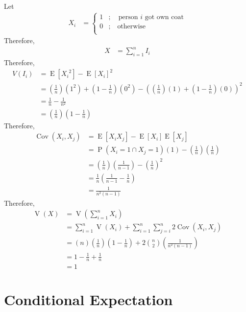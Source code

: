 \documentclass[titlepage, fleqn, a4paper, 12pt, twoside]{article}
\theoremstyle{definition}
\theoremstyle{theorem}
\DeclareMathOperator{\prob}{\mathrm{P}}
\DeclareMathOperator{\expct}{\mathrm{E}}
\DeclareMathOperator{\var}{\mathrm{V}}
\DeclareMathOperator{\cov}{\mathrm{Cov}}
\begin{document}
\begin{solution}
	Let
	\begin{align*}
		X_i &=
			\begin{cases}
				1 & ;\quad \text{person $i$ got own coat} \\
				0 & ;\quad \text{otherwise}               \\
			\end{cases}
	\end{align*}
	Therefore,
	\begin{align*}
		X &= \sum\limits_{i = 1}^{n} I_i
	\end{align*}
	Therefore,
	\begin{align*}
		V(I_i) &= \expct\left[ {X_i}^2 \right] - \expct[X_i]^2\\
		&= \left( \frac{1}{n} \right) \left( 1^2 \right) + \left( 1 - \frac{1}{n} \right) \left( 0^2 \right) - \left( \left( \frac{1}{n} \right) (1) + \left( 1 - \frac{1}{n} \right) (0) \right)^2\\
		&= \frac{1}{n} - \frac{1}{n^2}\\
		&= \left( \frac{1}{n} \right) \left( 1 - \frac{1}{n} \right)
	\end{align*}
	Therefore,
	\begin{align*}
		\cov(X_i,X_j) &= \expct[X_i X_j] - \expct[X_i] \expct[X_j]\\
		&= \prob(X_i = 1 \cap X_j = 1) (1) - \left( \frac{1}{n} \right) \left( \frac{1}{n} \right)\\
		&= \left( \frac{1}{n} \right) \left( \frac{1}{n - 1} \right) - \left( \frac{1}{n} \right)^2\\
		&= \frac{1}{n} \left( \frac{1}{n - 1} - \frac{1}{n} \right)\\
		&= \frac{1}{n^2 (n - 1)}
	\end{align*}
	Therefore,
	\begin{align*}
		\var(X) &= \var\left( \sum\limits_{i = 1}^{n} X_i \right)\\
		&= \sum\limits_{i = 1}^{n} \var(X_i) + \sum\limits_{i = 1}^{n} \sum\limits_{j = i}^{n} 2 \cov(X_i,X_j)\\
		&= (n) \left( \frac{1}{n} \right) \left( 1 - \frac{1}{n} \right) + 2 \binom{n}{2} \left( \frac{1}{n^2 (n - 1)} \right)\\
		&= 1 - \frac{1}{n} + \frac{1}{n}\\
		&= 1
	\end{align*}
\end{solution}

\section{Conditional Expectation}
\end{document}
